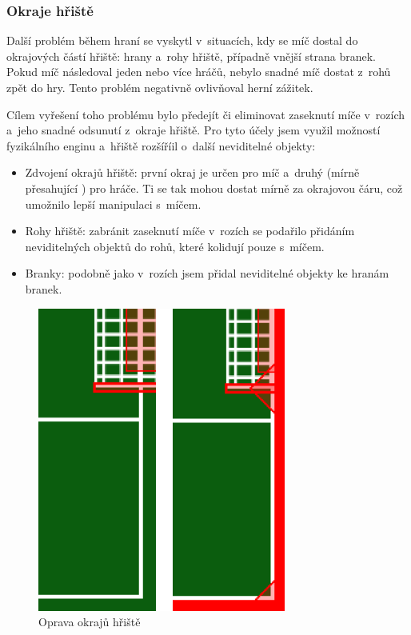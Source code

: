 \documentclass[thesis=B,czech,hidelinks]{FITthesis}[2012/06/26] %
\begin{document}
\subsubsection{Okraje hřiště}

Další problém během hraní se vyskytl v~situacích, kdy se míč dostal do okrajových částí hřiště: hrany a~rohy hřiště, případně vnější strana branek. Pokud míč následoval jeden nebo více hráčů, nebylo snadné míč dostat z~rohů zpět do hry. Tento problém negativně ovlivňoval herní zážitek.

Cílem vyřešení toho problému bylo předejít či eliminovat zaseknutí míče v~rozích a~jeho snadné odsunutí z~okraje hřiště. Pro tyto účely jsem využil možností fyzikálního enginu a~hřiště rozšíříil o~další neviditelné objekty:

\begin{itemize}
	\item Zdvojení okrajů hřiště: první okraj je určen pro míč a~druhý (mírně přesahující ) pro hráče. Ti se tak mohou dostat mírně za okrajovou čáru, což umožnilo lepší manipulaci s~míčem.
	\item Rohy hřiště: zabránit zaseknutí míče v~rozích se podařilo přidáním neviditelných objektů do rohů, které kolidují pouze s~míčem.
	\item Branky: podobně jako v~rozích jsem přidal neviditelné objekty ke hranám branek.
\end{itemize}

\begin{figure}[h]
\center
\includegraphics[width=\textwidth/2]{corners}
\caption{Oprava okrajů hřiště}
\label{picture:corners}
\end{figure}
\end{document}

